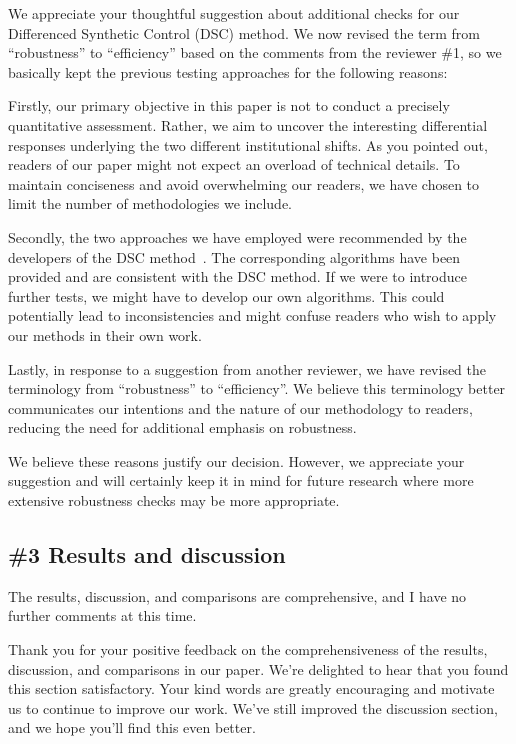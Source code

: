 \AR{} We appreciate your thoughtful suggestion about additional checks for our Differenced Synthetic Control (DSC) method. We now revised the term from ``robustness'' to ``efficiency'' based on the comments from the reviewer \#1, so we basically kept the previous testing approaches for the following reasons:

\AR*{} Firstly, our primary objective in this paper is not to conduct a precisely quantitative assessment. Rather, we aim to uncover the interesting differential responses underlying the two different institutional shifts. As you pointed out, readers of our paper might not expect an overload of technical details. To maintain conciseness and avoid overwhelming our readers, we have chosen to limit the number of methodologies we include.

\AR*{} Secondly, the two approaches we have employed were recommended by the developers of the DSC method~\cite{engelbrektson2023}.
The corresponding algorithms have been provided and are consistent with the DSC method. If we were to introduce further tests, we might have to develop our own algorithms. This could potentially lead to inconsistencies and might confuse readers who wish to apply our methods in their own work.

\AR*{} Lastly, in response to a suggestion from another reviewer, we have revised the terminology from ``robustness'' to ``efficiency''. We believe this terminology better communicates our intentions and the nature of our methodology to readers, reducing the need for additional emphasis on robustness.

\AR*{} We believe these reasons justify our decision. However, we appreciate your suggestion and will certainly keep it in mind for future research where more extensive robustness checks may be more appropriate.

\subsection{\#3 Results and discussion}\label{sec:2-3}

\RC{} The results, discussion, and comparisons are comprehensive, and I have no further comments at this time.

\AR{} Thank you for your positive feedback on the comprehensiveness of the results, discussion, and comparisons in our paper. We're delighted to hear that you found this section satisfactory. Your kind words are greatly encouraging and motivate us to continue to improve our work. We've still improved the discussion section, and we hope you'll find this even better.

